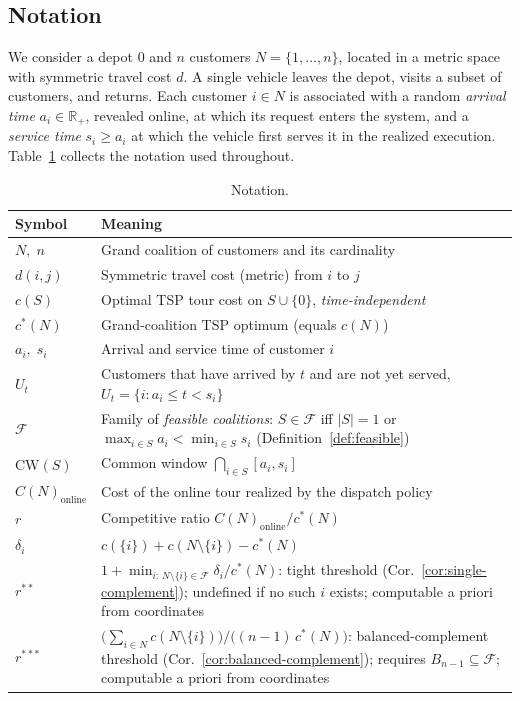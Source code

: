 \documentclass[11pt]{article}
\theoremstyle{plain}
\theoremstyle{definition}
\theoremstyle{remark}
\newcommand{\F}{\mathcal{F}}
\newcommand{\CW}{\mathrm{CW}}
\newcommand{\cstar}{c^{\ast}}
\begin{document}
\subsection{Notation}
We consider a depot $0$ and $n$ customers $N = \{1,\ldots,n\}$, located in a metric space with symmetric travel cost $d$. A single vehicle leaves the depot, visits a subset of customers, and returns. Each customer $i\in N$ is associated with a random \emph{arrival time} $a_i \in \mathbb{R}_+$, revealed online, at which its request enters the system, and a \emph{service time} $s_i \ge a_i$ at which the vehicle first serves it in the realized execution. Table~\ref{tab:notation} collects the notation used throughout.

\begin{table}[t]
\centering
\caption{Notation.}
\label{tab:notation}
\small
\begin{tabular}{@{}lp{}@{}}
\toprule
Symbol & Meaning \\
\midrule
$N,\; n$ & Grand coalition of customers and its cardinality \\
$d(i,j)$ & Symmetric travel cost (metric) from $i$ to $j$ \\
$c(S)$ & Optimal TSP tour cost on $S\cup\{0\}$, \emph{time-independent} \\
$\cstar(N)$ & Grand-coalition TSP optimum (equals $c(N)$) \\
$a_i,\; s_i$ & Arrival and service time of customer $i$ \\
$U_t$ & Customers that have arrived by $t$ and are not yet served, $U_t=\{i:a_i\le t< s_i\}$ \\
$\F$ & Family of \emph{feasible coalitions}: $S\in\F$ iff $|S|=1$ or $\max_{i\in S} a_i < \min_{i\in S} s_i$ (Definition~\ref{def:feasible}) \\
$\CW(S)$ & Common window $\bigcap_{i\in S}[a_i, s_i]$ \\
$C(N)_{\text{online}}$ & Cost of the online tour realized by the dispatch policy \\
$r$ & Competitive ratio $C(N)_{\text{online}}/\cstar(N)$ \\
$\delta_i$ & $c(\{i\})+c(N\setminus\{i\})-\cstar(N)$ \\
$r^{\ast\ast}$ & $1+\min_{i:\,N\setminus\{i\}\in\F}\delta_i/\cstar(N)$: tight threshold (Cor.~\ref{cor:single-complement}); undefined if no such $i$ exists; computable a priori from coordinates \\
$r^{\ast\ast\ast}$ & $\bigl(\sum_{i\in N} c(N\setminus\{i\})\bigr)/\bigl((n-1)\,\cstar(N)\bigr)$: balanced-complement threshold (Cor.~\ref{cor:balanced-complement}); requires $B_{n-1}\subseteq\F$; computable a priori from coordinates \\

\end{tabular}
\end{table}
\end{document}
